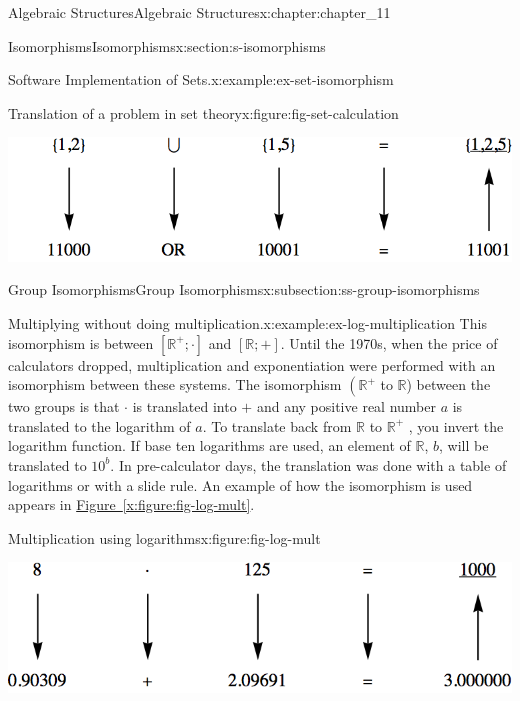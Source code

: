 \documentclass[oneside,10pt,]{book}
\newcommand{\xreffont}{\relax}
\numberwithin{equation}{section}
\begin{document}
\begin{chapterptx}{Algebraic Structures}{}{Algebraic Structures}{}{}{x:chapter:chapter_11}
\begin{sectionptx}{Isomorphisms}{}{Isomorphisms}{}{}{x:section:s-isomorphisms}
\begin{introduction}{}
\begin{example}{Software Implementation of Sets.}{x:example:ex-set-isomorphism}
\begin{figureptx}{Translation of a problem in set theory}{x:figure:fig-set-calculation}{}%
\begin{image}{0.15}{0.7}{0.15}%
\includegraphics[width=\linewidth]{images/fig-set-calculation.png}
\end{image}%
\tcblower
\end{figureptx}%
\end{example}
\end{introduction}%
%
%
\typeout{************************************************}
\typeout{************************************************}
%
\begin{subsectionptx}{Group Isomorphisms}{}{Group Isomorphisms}{}{}{x:subsection:ss-group-isomorphisms}
\begin{example}{Multiplying without doing multiplication.}{x:example:ex-log-multiplication}%
This isomorphism is between \(\left[\mathbb{R}^+ ; \cdot \right]\) and \([\mathbb{R};+]\). Until the 1970s, when the price of calculators dropped, multiplication and exponentiation were performed with an isomorphism between these systems. The isomorphism \(\left(\mathbb{R}^+\right.\) to \(\mathbb{R}\)) between the two groups is that \(\cdot\) is translated into \(+\) and any positive real number \(a\) is translated to the logarithm of \(a\). To translate back from \(\mathbb{R}\) to \(\mathbb{R}^+\) , you invert the logarithm function. If base ten logarithms are used, an element of \(\mathbb{R}\), \(b\), will be translated to \(10^b\).  In pre-calculator days, the translation was done with a table of logarithms or with a slide rule. An example of how the isomorphism is used appears in \hyperref[x:figure:fig-log-mult]{Figure~{\xreffont\ref{x:figure:fig-log-mult}}}.%
\begin{figureptx}{Multiplication using logarithms}{x:figure:fig-log-mult}{}%
\begin{image}{0.15}{0.7}{0.15}%
\includegraphics[width=\linewidth]{images/fig-log-mult.png}

\end{image}
\end{figureptx}
\end{example}
\end{subsectionptx}
\end{sectionptx}
\end{chapterptx}
\end{document}
